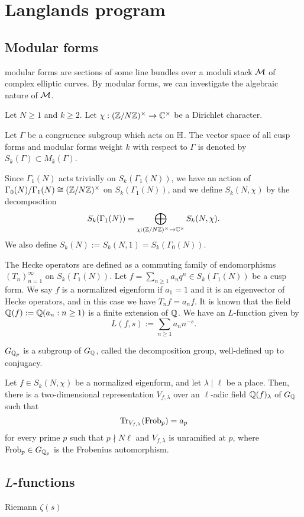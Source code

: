 \documentclass{../../large}
\newcommand{\Frob}{\mathrm{Frob}}
\begin{document}
\part{Langlands program}
\chapter{Modular forms}

modular forms are sections of some line bundles over a moduli stack $\mathcal{M}$ of complex elliptic curves.
By modular forms, we can investigate the algebraic nature of $\mathcal{M}$.


Let $N\ge1$ and $k\ge2$.
Let $\chi:(\mathbb{Z}/N\mathbb{Z})^\times\to\mathbb{C}^\times$ be a Dirichlet character.

Let $\Gamma$ be a congruence subgroup which acts on $\mathbb{H}$.
The vector space of all cusp forms and modular forms weight $k$ with respect to $\Gamma$ is denoted by $S_k(\Gamma)\subset M_k(\Gamma)$.


Since $\Gamma_1(N)$ acts trivially on $S_k(\Gamma_1(N))$, we have an action of $\Gamma_0(N)/\Gamma_1(N)\cong(\mathbb{Z}/N\mathbb{Z})^\times$ on $S_k(\Gamma_1(N))$, and we define $S_k(N,\chi)$ by the decomposition
\[S_k(\Gamma_1(N))=\bigoplus_{\chi:(\mathbb{Z}/N\mathbb{Z})^\times\to\mathbb{C}^\times}S_k(N,\chi).\]
We also define $S_k(N):=S_k(N,1)=S_k(\Gamma_0(N))$.

The Hecke operators are defined as a commuting family of endomorphisms $(T_n)_{n=1}^\infty$ on $S_k(\Gamma_1(N))$.
Let $f=\sum_{n\ge1}a_nq^n\in S_k(\Gamma_1(N))$ be a cusp form.
We say $f$ is a normalized eigenform if $a_1=1$ and it is an eigenvector of Hecke operators, and in this case we have $T_nf=a_nf$.
It is known that the field $\mathbb{Q}(f):=\mathbb{Q}(a_n:n\ge1)$ is a finite extension of $\mathbb{Q}$.
We have an $L$-function given by
\[L(f,s):=\sum_{n\ge1}a_nn^{-s}.\]


$G_{\mathbb{Q}_p}$ is a subgroup of $G_{\mathbb{Q}}$, called the decomposition group, well-defined up to conjugacy.

Let $f\in S_k(N,\chi)$ be a normalized eigenform, and let $\lambda\mid\ell$ be a place.
Then, there is a two-dimensional representation $V_{f,\lambda}$ over an $\ell$-adic field $\mathbb{Q}(f)_\lambda$ of $G_{\mathbb{Q}}$ such that
\[\Tr_{V_{f,\lambda}}(\Frob_p)=a_p\]
for every prime $p$ such that $p\nmid N\ell$ and $V_{f,\lambda}$ is unramified at $p$, where $\Frob_p\in G_{\Q_p}$ is the Frobenius automorphism.



\chapter{$L$-functions}
Riemann $\zeta(s)$
\end{document}
